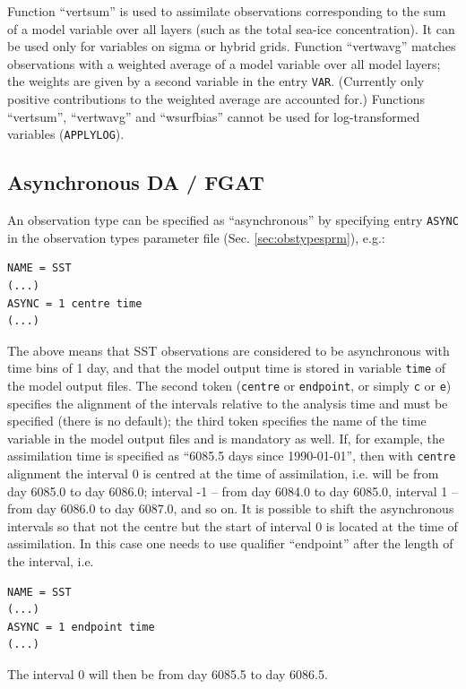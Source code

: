 \documentclass[11pt]{report}
\begin{document}
Function ``vertsum'' is used to assimilate observations corresponding to the sum of a model variable over all layers (such as the total sea-ice concentration).
It can be used only for variables on sigma or hybrid grids.
Function ``vertwavg'' matches observations with a weighted average of a model variable over all model layers; the weights are given by a second variable in the entry \verb|VAR|.
(Currently only positive contributions to the weighted average are accounted for.)
Functions ``vertsum'', ``vertwavg'' and ``wsurfbias'' cannot be used for log-transformed variables (\verb|APPLYLOG|).

\subsection{Asynchronous DA / FGAT}
\label{sec:async}

An observation type can be specified as ``asynchronous'' by specifying entry \verb|ASYNC| in the observation types parameter file (Sec. \ref{sec:obstypesprm}), e.g.:
\begin{Verbatim}[frame=single,fontsize=\footnotesize]
NAME = SST
(...)
ASYNC = 1 centre time
(...)
\end{Verbatim}
The above means that SST observations are considered to be asynchronous with time bins of 1 day, and that the model output time is stored in variable \verb|time| of the model output files.
The second token (\verb|centre| or \verb|endpoint|, or simply \verb|c| or \verb|e|) specifies the alignment of the intervals relative to the analysis time and must be specified (there is no default); the third token specifies the name of the time variable in the model output files and is mandatory as well.
If, for example, the assimilation time is specified as ``6085.5 days since 1990-01-01'', then with \verb|centre| alignment the interval 0 is centred at the time of assimilation, i.e. will be from day 6085.0 to day 6086.0; interval -1 -- from day 6084.0 to day 6085.0, interval 1 -- from day 6086.0 to day 6087.0, and so on.
It is possible to shift the asynchronous intervals so that not the centre but the start of interval 0 is located at the time of assimilation.
In this case one needs to use qualifier ``endpoint'' after the length of the interval, i.e.
\begin{Verbatim}[frame=single,fontsize=\footnotesize]
NAME = SST
(...)
ASYNC = 1 endpoint time
(...)
\end{Verbatim}
The interval 0 will then be from day 6085.5 to day 6086.5.
\end{document}
